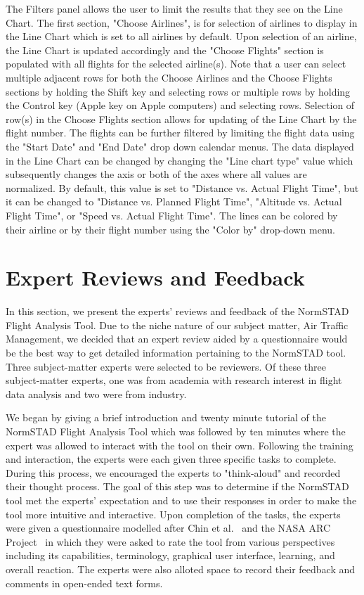 \documentclass{sig-alternate}
\begin{document}
The Filters panel allows the user to limit the results that they see on the Line
Chart. The first section, "Choose Airlines", is for selection of airlines to display 
in the Line Chart which is set to all airlines by default.
Upon selection of an airline, the Line Chart is updated accordingly and the
"Choose Flights" section is populated with all
flights for the selected airline(s). Note that a user can select multiple adjacent
rows for both the Choose Airlines and the Choose Flights sections
by holding the Shift key and selecting rows or 
multiple rows by holding the Control key (Apple key on Apple computers) and selecting rows. 
Selection of row(s) in the Choose Flights section allows for updating of the Line Chart
by the flight number. The flights can be further filtered by limiting the flight data
using the "Start Date" and "End Date" drop down calendar menus. The data displayed 
in the Line Chart can be changed by changing the "Line chart type" value which subsequently
changes the axis or both of the axes where 
all values are normalized. By default, this value is set to "Distance vs. Actual Flight Time",
but it can be changed to "Distance vs. Planned Flight Time", "Altitude vs. Actual Flight Time",
or "Speed vs. Actual Flight Time". The lines can be colored by their airline or by their 
flight number using the "Color by" drop-down menu. 


\section{Expert Reviews and Feedback}
\label{sec-expert-review}

In this section, we present the experts' reviews and feedback of the NormSTAD Flight 
Analysis Tool. Due to the niche nature of our subject matter, Air Traffic Management, we decided
that an expert review aided by a questionnaire would be the best way to get detailed
information pertaining to the NormSTAD tool. Three subject-matter experts were selected
to be reviewers. Of these three subject-matter experts, one was from academia with 
research interest in flight data analysis and two were from industry. 

We began by giving a brief introduction and twenty minute
tutorial of the NormSTAD Flight Analysis Tool which was followed by ten minutes where
the expert was allowed to interact with the tool on their own. Following the training
and interaction, the experts were each given three specific tasks to complete. 
During this process, we encouraged the experts to "think-aloud" and recorded their 
thought process. The goal of this step was to determine if the NormSTAD tool met
the experts' expectation and to use their responses in order to make the tool
more intuitive and interactive. Upon completion of the tasks, the experts were
given a questionnaire modelled after Chin et al.~\cite{Chin88} and the 
NASA ARC Project~\cite{NASA}
 in which they were asked to rate the tool from various perspectives
including its capabilities, terminology, graphical user interface, learning, and
overall reaction. The experts were also alloted space to record their feedback
and comments in open-ended text forms.
\end{document}
